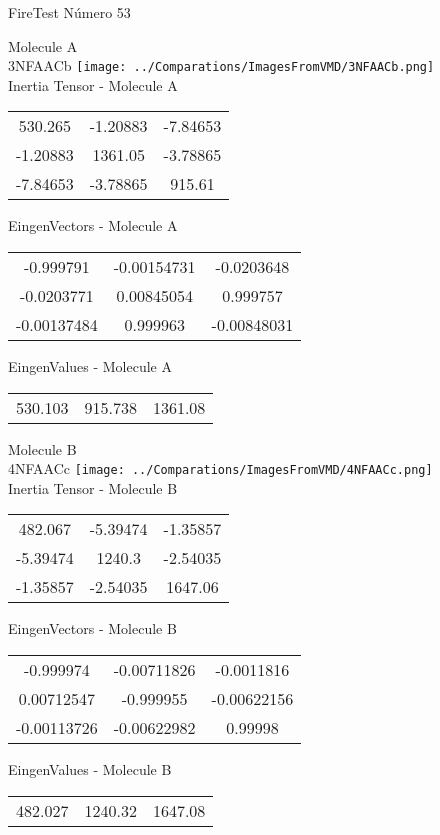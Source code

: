 \vtab[-2cm]
\begin{center}
{\large FireTest \tab Número 53}
\end{center}
\begin{multicols}{2}
\begin{center}

Molecule A \\ 
3NFAACb
\texttt{[image: ../Comparations/ImagesFromVMD/3NFAACb.png]}
\\
Inertia Tensor - Molecule A \\
\vtab

\begin{tabular}{|c c c|}
530.265	 & 	-1.20883	 & 	-7.84653	 \\
-1.20883	 & 	1361.05	 & 	-3.78865	 \\
-7.84653	 & 	-3.78865	 & 	915.61
\end{tabular}

\vtab
 EingenVectors - Molecule A     \\
\vtab
\begin{tabular}{|c c c|}
-0.999791	 & 	-0.00154731	 & 	-0.0203648	 \\
-0.0203771	 & 	0.00845054	 & 	0.999757	 \\
-0.00137484	 & 	0.999963	 & 	-0.00848031
\end{tabular}

\vtab
 EingenValues - Molecule A     \\
\vtab
\begin{tabular}{|c c c|}
530.103	 & 	915.738	 & 	1361.08	 \\
\end{tabular}
\columnbreak

Molecule B \\ 
4NFAACc
\texttt{[image: ../Comparations/ImagesFromVMD/4NFAACc.png]}
\\
Inertia Tensor - Molecule B \\
\vtab

\begin{tabular}{|c c c|}
482.067	 & 	-5.39474	 & 	-1.35857	 \\
-5.39474	 & 	1240.3	 & 	-2.54035	 \\
-1.35857	 & 	-2.54035	 & 	1647.06
\end{tabular}

\vtab
 EingenVectors - Molecule B     \\
\vtab
\begin{tabular}{|c c c|}
-0.999974	 & 	-0.00711826	 & 	-0.0011816	 \\
0.00712547	 & 	-0.999955	 & 	-0.00622156	 \\
-0.00113726	 & 	-0.00622982	 & 	0.99998
\end{tabular}

\vtab
 EingenValues - Molecule B     \\
\vtab
\begin{tabular}{|c c c|}
482.027	 & 	1240.32	 & 	1647.08	 \\
\end{tabular}

\end{center}
\end{multicols}
